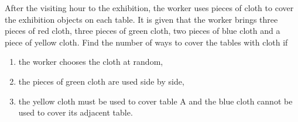 \documentclass{report}
\begin{document}
\begin{multicols*}{2}
\begin{enumerate}
                  After the visiting hour to the exhibition, the worker uses pieces of cloth to
                  cover the exhibition objects on each table. It is given that the worker brings
                  three pieces of red cloth, three pieces of green cloth, two pieces of blue
                  cloth and a piece of yellow cloth. Find the number of ways to cover the tables
                  with cloth if
                  \begin{enumerate}
                        \item the worker chooses the cloth at random,
                        \item the pieces of green cloth are used side by side,
                        \item the yellow cloth must be used to cover table A and the blue cloth cannot be
                              used to cover its adjacent table.
                  \end{enumerate}
      \end{enumerate}
\end{multicols*}
\end{document}
